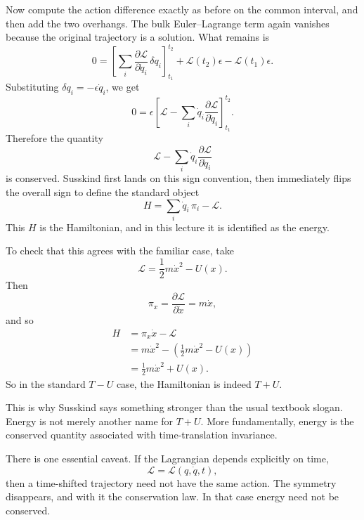 Now compute the action difference exactly as before on the common interval, and then add the two overhangs. The bulk Euler--Lagrange term again vanishes because the original trajectory is a solution. What remains is
\begin{equation}
0
=
\left[
\sum_i
\frac{\partial \mathcal{L}}{\partial \dot q_i}\,\delta q_i
\right]_{t_1}^{t_2}
+
\mathcal{L}(t_2)\epsilon
-
\mathcal{L}(t_1)\epsilon.
\end{equation}
Substituting \(\delta q_i=-\epsilon \dot q_i\), we get
\begin{equation}
0
=
\epsilon
\left[
\mathcal{L}
-
\sum_i
\dot q_i
\frac{\partial \mathcal{L}}{\partial \dot q_i}
\right]_{t_1}^{t_2}.
\end{equation}
Therefore the quantity
\begin{equation}
\mathcal{L}
-
\sum_i
\dot q_i
\frac{\partial \mathcal{L}}{\partial \dot q_i}
\end{equation}
is conserved. Susskind first lands on this sign convention, then immediately flips the overall sign to define the standard object
\begin{equation}
H=\sum_i \dot q_i\,\pi_i-\mathcal{L}.
\end{equation}
This \(H\) is the Hamiltonian, and in this lecture it is identified as the energy.

To check that this agrees with the familiar case, take
\begin{equation}
\mathcal{L}=\frac{1}{2}m\dot x^2-U(x).
\end{equation}
Then
\begin{equation}
\pi_x=\frac{\partial \mathcal{L}}{\partial \dot x}=m\dot x,
\end{equation}
and so
\begin{align}
H
&=\pi_x\dot x-\mathcal{L} \\
&=m\dot x^2-\left(\frac{1}{2}m\dot x^2-U(x)\right) \\
&=\frac{1}{2}m\dot x^2+U(x).
\end{align}
So in the standard \(T-U\) case, the Hamiltonian is indeed \(T+U\).

This is why Susskind says something stronger than the usual textbook slogan. Energy is not merely another name for \(T+U\). More fundamentally, energy is the conserved quantity associated with time-translation invariance.

There is one essential caveat. If the Lagrangian depends explicitly on time,
\begin{equation}
\mathcal{L}=\mathcal{L}(q,\dot q,t),
\end{equation}
then a time-shifted trajectory need not have the same action. The symmetry disappears, and with it the conservation law. In that case energy need not be conserved.

